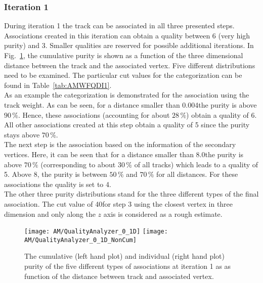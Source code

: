 

\subsubsection{Iteration 1}
During iteration 1 the track can be associated in all three presented steps. Associations created in this iteration can obtain a quality between 6 (very high purity) and 3. Smaller qualities are reserved for possible additional iterations. In Fig.~\ref{plot:AMWFQualityI1}, the cumulative purity is shown as a function of the three dimensional distance between the track and the associated vertex. Five different distributions need to be examined. The particular cut values for the categorization can be found in Table~\ref{tab:AMWFQDI1}. \\
As an example the categorization is demonstrated for the association using the track weight. As can be seen, for a distance smaller than 0.004\cm the purity is above $90\,\%$. Hence, these associations (accounting for about $28\,\%$) obtain a quality of 6. All other associations created at this step obtain a quality of 5 since the purity stays above $70\,\%$. \\
The next step is the association based on the information of the secondary vertices. Here, it can be seen that for a distance smaller than 8.0\cm the purity is above $70\,\%$ (corresponding to about $30\,\%$ of all tracks) which leads to a quality of 5. Above 8\cm{}, the purity is between $50\,\%$ and $70\,\%$ for all distances. For these associations the quality is set to 4. \\
The other three purity distributions stand for the three different types of the final association. The cut value of 40\cm for step 3 using the closest vertex in three dimension and only along the $z$ axis is considered as a rough estimate.

\begin{figure}[!ht]
    \centering
    \texttt{[image: AM/QualityAnalyzer\_0\_1D]}
    \texttt{[image: AM/QualityAnalyzer\_0\_1D\_NonCum]}
    \caption[Cumulative and normal purity of iteration 1 vs distance to define quality]{The cumulative (left hand plot) and individual (right hand plot) purity of the five different types of associations at iteration 1 as as function of the distance between track and associated vertex.\label{plot:AMWFQualityI1}}
\end{figure}



